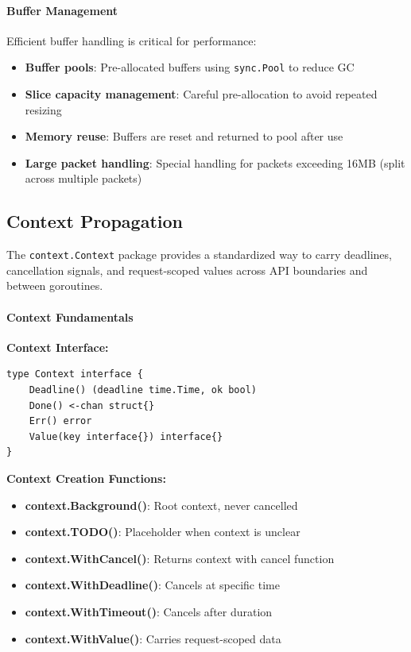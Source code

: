 \paragraph{Buffer Management}

Efficient buffer handling is critical for performance:

\begin{itemize}
    \item \textbf{Buffer pools}: Pre-allocated buffers using \texttt{sync.Pool} to reduce GC
    \item \textbf{Slice capacity management}: Careful pre-allocation to avoid repeated resizing
    \item \textbf{Memory reuse}: Buffers are reset and returned to pool after use
    \item \textbf{Large packet handling}: Special handling for packets exceeding 16MB (split across multiple packets)
\end{itemize}

\subsection{Context Propagation}

The \texttt{context.Context} package provides a standardized way to carry deadlines, cancellation signals, and request-scoped values across API boundaries and between goroutines.

\paragraph{Context Fundamentals}

\textbf{Context Interface:}
\begin{verbatim}
type Context interface {
    Deadline() (deadline time.Time, ok bool)
    Done() <-chan struct{}
    Err() error
    Value(key interface{}) interface{}
}
\end{verbatim}

\textbf{Context Creation Functions:}
\begin{itemize}
    \item \textbf{context.Background()}: Root context, never cancelled
    \item \textbf{context.TODO()}: Placeholder when context is unclear
    \item \textbf{context.WithCancel()}: Returns context with cancel function
    \item \textbf{context.WithDeadline()}: Cancels at specific time
    \item \textbf{context.WithTimeout()}: Cancels after duration
    \item \textbf{context.WithValue()}: Carries request-scoped data
\end{itemize}

